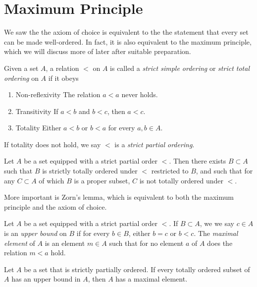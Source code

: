 \section{Maximum Principle}
We saw the the axiom of choice is equivalent to the the statement that
every set can be made well-ordered. In fact, it is also equivalent to the
maximum principle, which we will discuss more of later after suitable
preparation.
\begin{definition}
Given a set $A$, a relation $<$ on $A$ is called a
\emph{strict simple ordering} or \emph{strict total ordering}
on $A$ if it obeys
\begin{enumerate}
  \item{Non-reflexivity} The relation $a < a$ never holds.
  \item{Transitivity} If $a < b$ and $b < c$, then $a < c$.
  \item{Totality} Either $a < b$ or $b < a$ for every $a,b \in A$.
\end{enumerate}
If totality does not hold, we say $<$ is a \emph{strict partial ordering}.
\end{definition}
\begin{theorem}
Let $A$ be a set equipped with a strict partial order $<$. Then there exists $B
\subset A$ such that $B$ is strictly totally ordered under $<$ restricted to
$B$, and such that for any $C \subset A$ of which $B$ is a proper subset, $C$
is not totally ordered under $<$.
\end{theorem}
More important is Zorn's lemma, which is equivalent to both the maximum
principle and the axiom of choice.
\begin{definition}
\label{def:zorn-def}
Let $A$ be a set equipped with a strict partial order $<$. If $B \subset A$,
we we say $c \in A$ is an \emph{upper bound} on $B$ if for every $b \in B$,
either $b = c$ or $b < c$. The \emph{maximal element} of $A$ is an element
$m \in A$ such that for no element $a$ of $A$ does the relation $m < a$ hold.
\end{definition}
\begin{theorem}
Let $A$ be a set that is strictly partially ordered. If every totally ordered
subset of $A$ has an upper bound in $A$, then $A$ has a maximal element.
\end{theorem}
